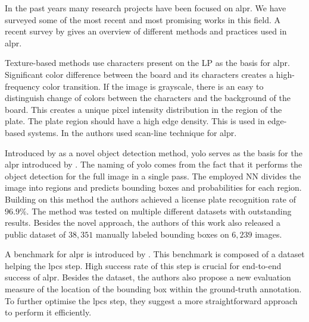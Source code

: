\label{previous-solutions}
In the past years many research projects have been focused on \ac{alpr}.
We have surveyed some of the most recent and most promising works in this field.
A recent survey by \cite{survOnMet} gives an overview of different methods and
practices used in \ac{alpr}.

Texture-based methods use characters present on the \ac{LP} as the basis for
\ac{alpr}. Significant color difference between the board and its characters
creates a high-frequency color transition. If the image is grayscale,
there is an easy to distinguish change of colors between the characters and the
background of the board. This creates a unique pixel intensity distribution in
the region of the plate. The plate region should have a high edge density. This
is used in edge-based systems. In \cite{HongFuJiaHuan} the authors used
scan-line technique for \ac{alpr}.

Introduced by \cite{redmon2016look} as a novel object detection method,
\ac{yolo} serves as the basis for the \ac{alpr} introduced by
\cite{DBLP:journals/corr/abs-1909-01754}.
The naming of \ac{yolo} comes from the fact that it performs the object detection
for the full image in a single pass. The employed \ac{NN} divides the image
into regions and predicts bounding boxes and probabilities for each region.
Building on this method the authors achieved a license plate recognition rate of
$96.9\%$.  The method was tested on multiple different datasets with outstanding
results.  Besides the novel approach, the authors of this work also released
a public dataset of $38,351$ manually labeled bounding boxes on $6,239$ images.

A benchmark for \ac{alpr} is introduced by
\cite{DBLP:journals/corr/GoncalvesSMS16}. This benchmark is
composed of a dataset helping the \ac{lpcs} step. High success rate of this step
is crucial for end-to-end success of \ac{alpr}. Besides the dataset, the authors
also propose a new evaluation measure of the location of the bounding
box within the ground-truth annotation. To further optimise the \ac{lpcs} step,
they suggest a more straightforward approach to perform it efficiently.

